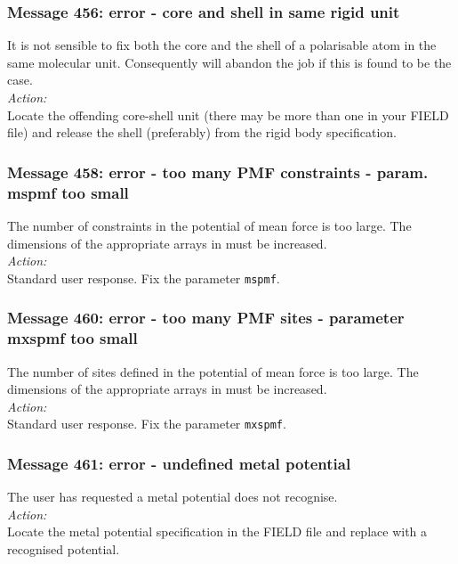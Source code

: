 \subsubsection*{Message 456: error - core and shell in same rigid unit}

It is not sensible to fix both the core and the shell of a polarisable
atom in the same molecular unit. Consequently \D{} will
abandon the job if this is found to be the case.\\

\noindent
{\em Action:} \\ Locate the offending core-shell unit (there may be
more than one in your FIELD file) and release the shell (preferably)
from the rigid body  specification.

\subsubsection*{Message 458: error - too many PMF constraints - param.
mspmf too small}

The number of constraints in the potential of mean force is too large.
The dimensions of the appropriate arrays in \D{} must be increased. \\

\noindent
{\em Action:}\\ Standard user response. Fix the parameter {\tt mspmf}.

\subsubsection*{Message 460: error - too many PMF sites - parameter
mxspmf too small}

The number of sites defined in the potential of mean force is too large.
The dimensions of the appropriate arrays in \D{} must be increased. \\

\noindent
{\em Action:}\\ Standard user response. Fix the parameter {\tt mxspmf}.

\subsubsection*{Message 461: error - undefined metal potential}

The user has requested a metal potential \D{} does not recognise.\\

\noindent
{\em Action:} \\
Locate the metal potential specification in the FIELD file and replace
with a recognised potential.\\

